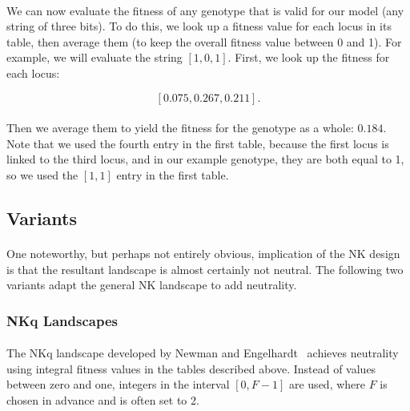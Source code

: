 \documentclass[12pt,letterpaper,titlepage]{article}
\begin{document}
\paragraph{}
We can now evaluate the fitness of any genotype that is valid for our model
(any string of three bits). To do this, we look up a fitness value for each
locus in its table, then average them (to keep the overall fitness value
between 0 and 1). For example, we will evaluate the string
$\left[1,0,1\right]$. First, we look up the fitness for each locus:

\begin{displaymath}
    \left[0.075, 0.267, 0.211\right].
\end{displaymath}

\paragraph{}
Then we average them to yield the fitness for the genotype as a whole: $0.184$.
Note that we used the fourth entry in the first table, because the first locus
is linked to the third locus, and in our example genotype, they are both equal
to 1, so we used the $\left[1, 1\right]$ entry in the first table.

\subsection{Variants}

\paragraph{}
One noteworthy, but perhaps not entirely obvious, implication of the NK design
is that the resultant landscape is almost certainly not neutral. The following
two variants adapt the general NK landscape to add neutrality.

\subsubsection{NKq Landscapes}

\paragraph{}
The NKq landscape developed by Newman and Engelhardt~\cite{Newman1998} achieves
neutrality using integral fitness values in the tables described above. Instead
of values between zero and one, integers in the interval $\left[0,F-1\right]$
are used, where $F$ is chosen in advance and is often set to 2.
\end{document}
